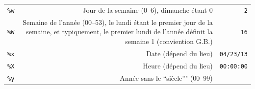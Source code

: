 \documentclass[12pt,]{book}
\numberwithin{equation}{section}
\numberwithin{countremarque}{section}
\begin{document}
\begin{longtable}[]{@{}rrr@{}}
\begin{minipage}[t]{0.10\columnwidth}\raggedleft\strut
\texttt{\%w}\strut
\end{minipage} & \begin{minipage}[t]{0.60\columnwidth}\raggedleft\strut
Jour de la semaine (0--6), dimanche étant 0\strut
\end{minipage} & \begin{minipage}[t]{0.22\columnwidth}\raggedleft\strut
\texttt{2}\strut
\end{minipage}\tabularnewline
\begin{minipage}[t]{0.10\columnwidth}\raggedleft\strut
\texttt{\%W}\strut
\end{minipage} & \begin{minipage}[t]{0.60\columnwidth}\raggedleft\strut
Semaine de l'année (00--53), le lundi étant le premier jour de la
semaine, et typiquement, le premier lundi de l'année définit la semaine
1 (conviention G.B.)\strut
\end{minipage} & \begin{minipage}[t]{0.22\columnwidth}\raggedleft\strut
\texttt{16}\strut
\end{minipage}\tabularnewline
\begin{minipage}[t]{0.10\columnwidth}\raggedleft\strut
\texttt{\%x}\strut
\end{minipage} & \begin{minipage}[t]{0.60\columnwidth}\raggedleft\strut
Date (dépend du lieu)\strut
\end{minipage} & \begin{minipage}[t]{0.22\columnwidth}\raggedleft\strut
\texttt{04/23/13}\strut
\end{minipage}\tabularnewline
\begin{minipage}[t]{0.10\columnwidth}\raggedleft\strut
\texttt{\%X}\strut
\end{minipage} & \begin{minipage}[t]{0.60\columnwidth}\raggedleft\strut
Heure (dépend du lieu)\strut
\end{minipage} & \begin{minipage}[t]{0.22\columnwidth}\raggedleft\strut
\texttt{00:00:00\textquotesingle{}}\strut
\end{minipage}\tabularnewline
\begin{minipage}[t]{0.10\columnwidth}\raggedleft\strut
\texttt{\%y}\strut
\end{minipage} & \begin{minipage}[t]{0.60\columnwidth}\raggedleft\strut
Année sans le ``siècle''" (00--99)\strut

\end{minipage}
\end{longtable}
\end{document}
